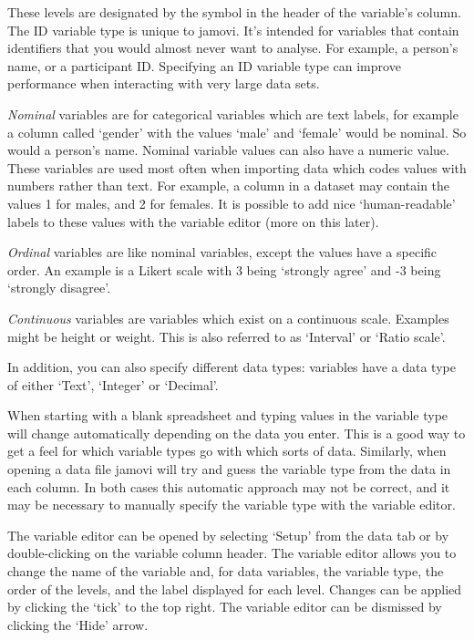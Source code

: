 \documentclass[
  a4paper,
]{book}
\begin{document}
These levels are designated by the symbol in the header of the
variable's column. The ID variable type is unique to jamovi. It's
intended for variables that contain identifiers that you would almost
never want to analyse. For example, a person's name, or a participant
ID. Specifying an ID variable type can improve performance when
interacting with very large data sets.

\emph{Nominal} variables are for categorical variables which are text
labels, for example a column called `gender' with the values `male' and
`female' would be nominal. So would a person's name. Nominal variable
values can also have a numeric value. These variables are used most
often when importing data which codes values with numbers rather than
text. For example, a column in a dataset may contain the values 1 for
males, and 2 for females. It is possible to add nice `human-readable'
labels to these values with the variable editor (more on this later).

\emph{Ordinal} variables are like nominal variables, except the values
have a specific order. An example is a Likert scale with 3 being
`strongly agree' and -3 being `strongly disagree'.

\emph{Continuous} variables are variables which exist on a continuous
scale. Examples might be height or weight. This is also referred to as
`Interval' or `Ratio scale'.

In addition, you can also specify different data types: variables have a
data type of either `Text', `Integer' or `Decimal'.

When starting with a blank spreadsheet and typing values in the variable
type will change automatically depending on the data you enter. This is
a good way to get a feel for which variable types go with which sorts of
data. Similarly, when opening a data file jamovi will try and guess the
variable type from the data in each column. In both cases this automatic
approach may not be correct, and it may be necessary to manually specify
the variable type with the variable editor.

The variable editor can be opened by selecting `Setup' from the data tab
or by double-clicking on the variable column header. The variable editor
allows you to change the name of the variable and, for data variables,
the variable type, the order of the levels, and the label displayed for
each level. Changes can be applied by clicking the `tick' to the top
right. The variable editor can be dismissed by clicking the `Hide'
arrow.
\end{document}
